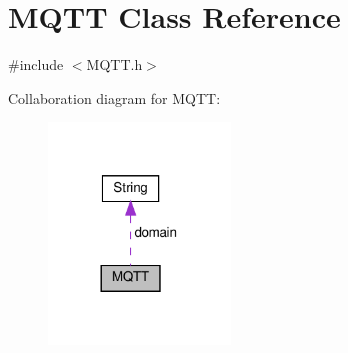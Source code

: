 \hypertarget{class_m_q_t_t}{}\section{M\+Q\+TT Class Reference}
\label{class_m_q_t_t}


{\ttfamily \#include $<$M\+Q\+T\+T.\+h$>$}



Collaboration diagram for M\+Q\+TT\+:
\nopagebreak
\begin{figure}[H]
\begin{center}
\leavevmode
\includegraphics[width=137pt]{class_m_q_t_t__coll__graph}
\end{center}
\end{figure}
